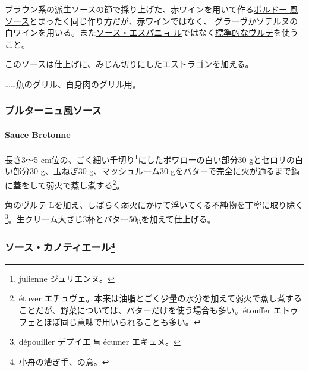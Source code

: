 \begin{recette}
ブラウン系の派生ソースの節で採り上げた、赤ワインを用いて作る\protect\hyperlink{sauce-bordelaise}{ボルドー
風ソース}とまったく同じ作り方だが、赤ワインではなく、
グラーヴかソテルヌの白ワインを用いる。また\protect\hyperlink{sauce-espagnole}{ソース・エスパニョ
ル}ではなく\protect\hyperlink{veloute}{標準的なヴルテ}を使うこと。

このソースは仕上げに、みじん切りにしたエストラゴンを加える。

\ldots{}\ldots{}魚のグリル、白身肉のグリル用。

\maeaki

\hypertarget{ux30d6ux30ebux30bfux30fcux30cbux30e5ux98a8ux30bdux30fcux30b9}{%
\subsubsection{ブルターニュ風ソース}\label{ux30d6ux30ebux30bfux30fcux30cbux30e5ux98a8ux30bdux30fcux30b9}}

\hypertarget{sauce-bretonne-blanche}{%
\paragraph{Sauce Bretonne}\label{sauce-bretonne-blanche}}


長さ3〜5 cm位の、ごく細い千切り\footnote{julienne ジュリエンヌ。}にしたポワローの白い部分30
gとセロリの白い部分30 g、玉ねぎ30 g、マッシュルーム30
gをバターで完全に火が通るまで鍋に蓋をして弱火で蒸し煮する\footnote{étuver
  エチュヴェ。本来は油脂とごく少量の水分を加えて弱火で蒸し煮することだが、野菜については、バターだけを使う場合も多い。étouffer
  エトゥフェとほぼ同じ意味で用いられることも多い。}。

\protect\hyperlink{veloute-de-poisson}{魚のヴルテ}\troisquarts{}
Lを加え、しばらく弱火にかけて浮いてくる不純物を丁寧に取り除く\footnote{dépouiller
  デプイエ ≒ écumer エキュメ。}。生クリーム大さじ3杯とバター50gを加えて仕上げる。

\maeaki

\hypertarget{ux30bdux30fcux30b9ux30abux30ceux30c6ux30a3ux30a8ux30fcux30eb20}{%
\subsubsection[ソース・カノティエール]{\texorpdfstring{ソース・カノティエール\footnote{小舟の漕ぎ手、の意。}}{ソース・カノティエール}}\label{ux30bdux30fcux30b9ux30abux30ceux30c6ux30a3ux30a8ux30fcux30eb20}}


\end{recette}
